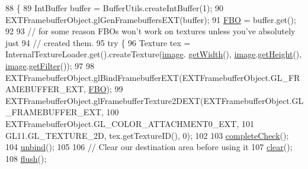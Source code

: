 \begin{DoxyCode}
88                                               \{
89         IntBuffer buffer = BufferUtils.createIntBuffer(1);
90         EXTFramebufferObject.glGenFramebuffersEXT(buffer); 
91         \mbox{\hyperlink{classorg_1_1newdawn_1_1slick_1_1opengl_1_1pbuffer_1_1_f_b_o_graphics_a94baa0295ca9f8d804b98c49be9abc8a}{FBO}} = buffer.get();
92 
93         \textcolor{comment}{// for some reason FBOs won't work on textures unless you've absolutely just}
94         \textcolor{comment}{// created them.}
95         \textcolor{keywordflow}{try} \{
96             Texture tex = InternalTextureLoader.get().createTexture(\mbox{\hyperlink{classorg_1_1newdawn_1_1slick_1_1opengl_1_1pbuffer_1_1_f_b_o_graphics_a7c88e67ddd520ec76bdc0082285ae909}{image}}.
      \mbox{\hyperlink{classorg_1_1newdawn_1_1slick_1_1_image_a94a5d32276e8a27930480223c5d69e11}{getWidth}}(), \mbox{\hyperlink{classorg_1_1newdawn_1_1slick_1_1opengl_1_1pbuffer_1_1_f_b_o_graphics_a7c88e67ddd520ec76bdc0082285ae909}{image}}.\mbox{\hyperlink{classorg_1_1newdawn_1_1slick_1_1_image_aa2594a93f5126f60ad8a72444fceee98}{getHeight}}(), \mbox{\hyperlink{classorg_1_1newdawn_1_1slick_1_1opengl_1_1pbuffer_1_1_f_b_o_graphics_a7c88e67ddd520ec76bdc0082285ae909}{image}}.\mbox{\hyperlink{classorg_1_1newdawn_1_1slick_1_1_image_aa4940d459c41d613a9f51a685d9b5c44}{getFilter}}());
97             
98             EXTFramebufferObject.glBindFramebufferEXT(EXTFramebufferObject.GL\_FRAMEBUFFER\_EXT, 
      \mbox{\hyperlink{classorg_1_1newdawn_1_1slick_1_1opengl_1_1pbuffer_1_1_f_b_o_graphics_a94baa0295ca9f8d804b98c49be9abc8a}{FBO}});
99             EXTFramebufferObject.glFramebufferTexture2DEXT(EXTFramebufferObject.GL\_FRAMEBUFFER\_EXT, 
100                                                            EXTFramebufferObject.GL\_COLOR\_ATTACHMENT0\_EXT,
101                                                            GL11.GL\_TEXTURE\_2D, tex.getTextureID(), 0);
102             
103             \mbox{\hyperlink{classorg_1_1newdawn_1_1slick_1_1opengl_1_1pbuffer_1_1_f_b_o_graphics_a6ce997c28b1b5d958103057135340507}{completeCheck}}();
104             \mbox{\hyperlink{classorg_1_1newdawn_1_1slick_1_1opengl_1_1pbuffer_1_1_f_b_o_graphics_a97b6e81e29ca7188a71d8a029d07befe}{unbind}}();
105             
106             \textcolor{comment}{// Clear our destination area before using it}
107             \mbox{\hyperlink{classorg_1_1newdawn_1_1slick_1_1_graphics_ac02dc23222f4d0d1498f38e27bf96a49}{clear}}();
108             \mbox{\hyperlink{classorg_1_1newdawn_1_1slick_1_1opengl_1_1pbuffer_1_1_f_b_o_graphics_ac288010f13cfdf0797b9c331dc85607c}{flush}}();

\end{DoxyCode}
